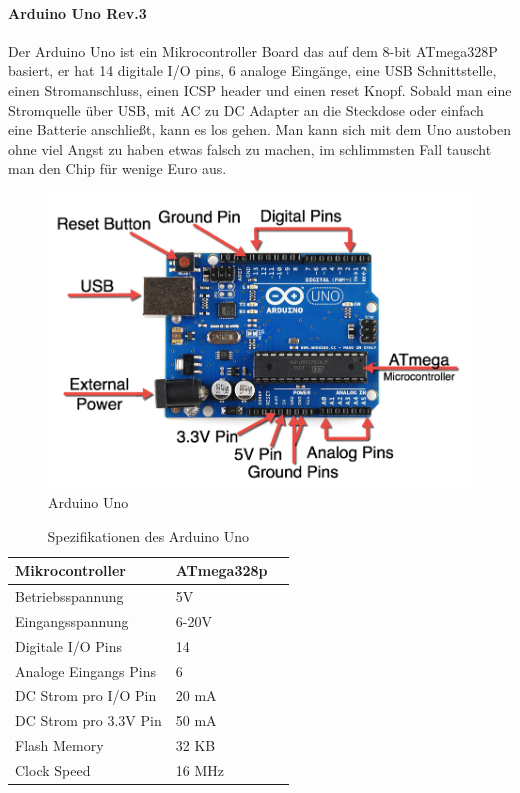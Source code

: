 \documentclass[12pt]{article}
\begin{document}
\paragraph{Arduino Uno Rev.3} Der Arduino Uno ist ein Mikrocontroller Board das auf dem 8-bit ATmega328P basiert, er hat 14 digitale I/O pins, 6 analoge Eingänge, eine USB Schnittstelle, einen Stromanschluss, einen ICSP header und einen reset Knopf. Sobald man eine Stromquelle über USB, mit AC zu DC Adapter an die Steckdose  oder einfach  eine Batterie anschließt, kann es los gehen. Man kann sich mit dem Uno austoben ohne viel Angst zu haben etwas falsch zu machen, im schlimmsten Fall tauscht man den Chip für wenige Euro aus.

\begin{figure}[thb]
\includegraphics[width=1\textwidth]{images/ArduinoParts.png}
\caption{Arduino Uno \cite{arduino-front}}
\end{figure}

\begin{table}[ht]
\caption{Spezifikationen des Arduino Uno \label{tab:table_label}}
\begin{tabularx}{\columnwidth}{XXl}
  Mikrocontroller&ATmega328p\\
  \hline
  Betriebsspannung&5V\\
  \hline
  Eingangsspannung&6-20V\\
  \hline
  Digitale I/O Pins&14\\
  \hline
  Analoge Eingangs Pins&6\\
  \hline
  DC Strom pro I/O Pin&20 mA\\
  \hline
  DC Strom pro 3.3V Pin&50 mA\\
  \hline
  Flash Memory&32 KB\\
  \hline
  Clock Speed&16 MHz\\
\end{tabularx}
\end{table}
\end{document}
